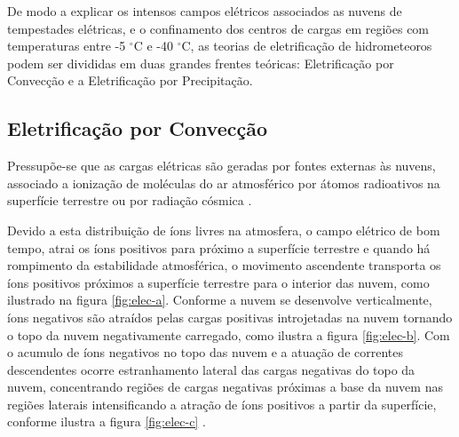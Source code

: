 De modo a explicar os intensos campos elétricos associados as nuvens de tempestades elétricas, e o confinamento dos centros de cargas em regiões com temperaturas entre -5 $^{\circ}$C e -40 $^{\circ}$C, as teorias de eletrificação de hidrometeoros podem ser divididas em duas grandes frentes teóricas: Eletrificação por Convecção e a Eletrificação por Precipitação.



\subsection{Eletrificação por Convecção}

Pressupõe-se que as cargas elétricas são geradas por fontes externas às nuvens, associado a ionização de moléculas do ar atmosférico por átomos radioativos na superfície terrestre ou por radiação cósmica \cite{wilson1956,grenet1947, vonnegut1962,phillips1967}.

Devido a esta distribuição de íons livres na atmosfera, o campo elétrico de bom tempo, atrai os íons positivos para próximo a superfície terrestre e quando há rompimento da estabilidade atmosférica, o movimento ascendente transporta os íons positivos próximos a superfície terrestre para o interior das nuvem, como ilustrado na figura \ref{fig:elec-a}. Conforme a nuvem se desenvolve verticalmente, íons negativos são atraídos pelas cargas positivas introjetadas na nuvem tornando o topo da nuvem negativamente carregado, como ilustra a figura \ref{fig:elec-b}. Com o acumulo de íons negativos no topo das nuvem e a atuação de correntes descendentes ocorre estranhamento lateral das cargas negativas do topo da nuvem, concentrando regiões de cargas negativas próximas a base da nuvem nas regiões laterais intensificando a atração de íons positivos a partir da superfície, conforme ilustra a figura \ref{fig:elec-c} \cite{vonnegut1962,wagner1981,vonnegut1995}.


